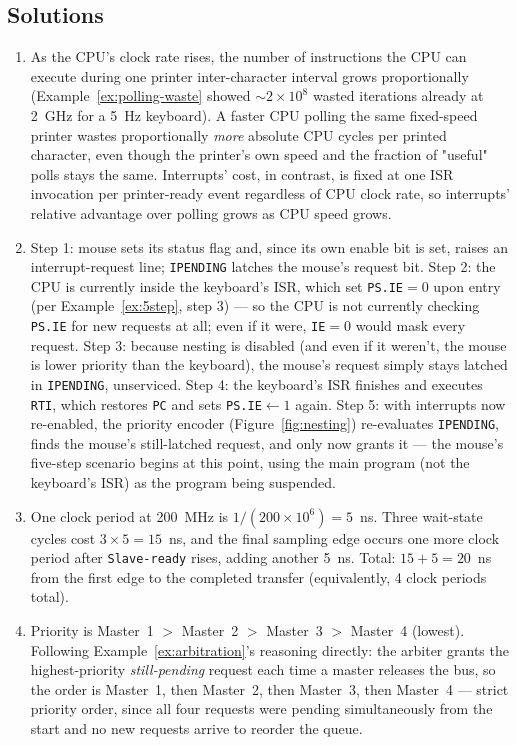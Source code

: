 \documentclass[11pt]{article}
\begin{document}
\subsection*{Solutions}
\begingroup\small
\begin{enumerate}
  \item As the CPU's clock rate rises, the number of instructions the CPU can execute during one printer inter-character interval grows proportionally (Example~\ref{ex:polling-waste} showed $\sim2\times10^8$ wasted iterations already at 2~GHz for a 5~Hz keyboard). A faster CPU polling the same fixed-speed printer wastes proportionally \emph{more} absolute CPU cycles per printed character, even though the printer's own speed and the fraction of "useful" polls stays the same. Interrupts' cost, in contrast, is fixed at one ISR invocation per printer-ready event regardless of CPU clock rate, so interrupts' relative advantage over polling grows as CPU speed grows.
  \item Step 1: mouse sets its status flag and, since its own enable bit is set, raises an interrupt-request line; \texttt{IPENDING} latches the mouse's request bit. Step 2: the CPU is currently inside the keyboard's ISR, which set \texttt{PS.IE}$=0$ upon entry (per Example~\ref{ex:5step}, step 3) --- so the CPU is not currently checking \texttt{PS.IE} for new requests at all; even if it were, \texttt{IE}$=0$ would mask every request. Step 3: because nesting is disabled (and even if it weren't, the mouse is lower priority than the keyboard), the mouse's request simply stays latched in \texttt{IPENDING}, unserviced. Step 4: the keyboard's ISR finishes and executes \texttt{RTI}, which restores \texttt{PC} and sets \texttt{PS.IE}$\gets1$ again. Step 5: with interrupts now re-enabled, the priority encoder (Figure~\ref{fig:nesting}) re-evaluates \texttt{IPENDING}, finds the mouse's still-latched request, and only now grants it --- the mouse's five-step scenario begins at this point, using the main program (not the keyboard's ISR) as the program being suspended.
  \item One clock period at 200~MHz is $1/(200\times10^6) = 5$~ns. Three wait-state cycles cost $3\times5=15$~ns, and the final sampling edge occurs one more clock period after \texttt{Slave-ready} rises, adding another 5~ns. Total: $15+5=20$~ns from the first edge to the completed transfer (equivalently, 4 clock periods total).
  \item Priority is Master~1 $>$ Master~2 $>$ Master~3 $>$ Master~4 (lowest). Following Example~\ref{ex:arbitration}'s reasoning directly: the arbiter grants the highest-priority \emph{still-pending} request each time a master releases the bus, so the order is Master~1, then Master~2, then Master~3, then Master~4 --- strict priority order, since all four requests were pending simultaneously from the start and no new requests arrive to reorder the queue.

\end{enumerate}
\end{document}
